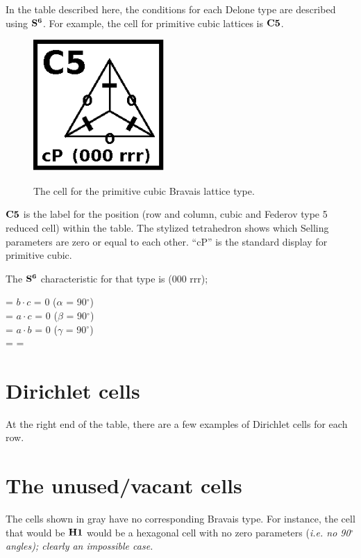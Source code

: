 \documentclass[preprint]{iucr}              %
\numberwithin{equation}{section}
\newcommand{\SVI}[0]{$\bf{S^{6}}$}
\begin{document}
		In the table described here, the conditions for each Delone
	type are described using \SVI{}. For example, the cell for
	primitive cubic lattices is $\bf{C5}$.
	
	
	\begin{figure}
		\includegraphics[width=5cm]{C5}
		\label{C5}
		\caption{The cell for the primitive cubic Bravais lattice type.}
	\end{figure}
	
	 $\bf{C5}$ is the label for the position (row and column, cubic and Federov type 5 reduced cell) within
	 the table. The stylized tetrahedron shows which Selling
	 parameters are zero or equal to each other. ``cP'' is the
	 standard display for primitive cubic.
	
	The \SVI{} characteristic for that type is (000 rrr); 
	
	\noindent
	\si{} = $b \cdot c$ = 0 ($\alpha$ = 90$^{\circ}$)\\
	\sii{} = $a \cdot c$ = 0 ($\beta$ = 90$^{\circ}$)\\
	\siii{} = $a \cdot b$ = 0 ($\gamma$ = 90$^{\circ}$)\\
	\siv{} = \sv{} = \svi{}	
	
\section{Dirichlet cells}

	At the right end of the table, there are a few examples of Dirichlet
	cells for each row. 
	
	
\section{The unused/vacant cells}

	The cells shown in gray have no corresponding Bravais type. For 
        instance, the cell that would be
	$\bf{H1}$ would be a hexagonal cell with no zero parameters
	(\it{i.e.} no 90$^{\circ}$ angles); 
	clearly an impossible case. 
	
\end{document}
